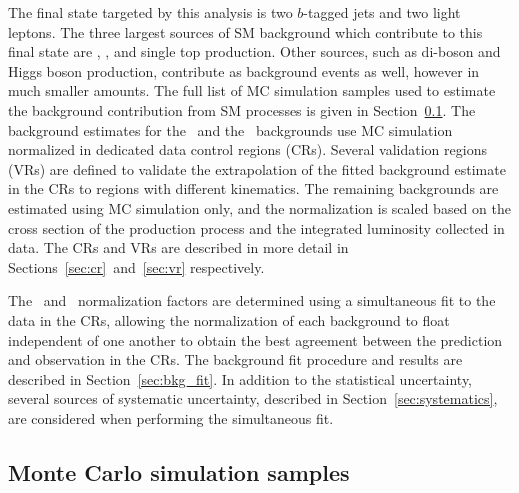 The final state targeted by this analysis is two $b$-tagged jets and two light
leptons.
The three largest sources of SM background which contribute to this final state
are \TTBAR, \ZGAMMAJETS, and single top production.
Other sources, such as di-boson and Higgs boson production, contribute as
background events as well, however in much smaller amounts.
The full list of MC simulation samples used to estimate the background
contribution from SM processes is given in Section~\ref{sec:mc_samples}.
The background estimates for the \TTBAR\ and the \ZGAMMAJETS\ backgrounds use
MC simulation normalized in dedicated data control regions (CRs).
Several validation regions (VRs) are defined to validate the extrapolation of
the fitted background estimate in the CRs to regions with different kinematics.
The remaining backgrounds are estimated using MC simulation only, and the
normalization is scaled based on the cross section of the production process and
the integrated luminosity collected in data.
The CRs and VRs are described in more detail in
Sections~\ref{sec:cr}~and~\ref{sec:vr} respectively.

The \TTBAR\ and \ZGAMMAJETS\ normalization factors are determined using a
simultaneous fit to the data in the CRs, allowing the normalization of each
background to float independent of one another to obtain the best agreement
between the prediction and observation in the CRs.
The background fit procedure and results are described in
Section~\ref{sec:bkg_fit}.
In addition to the statistical uncertainty, several sources of systematic
uncertainty, described in Section~\ref{sec:systematics}, are considered when
performing the simultaneous fit.

\FloatBarrier
\subsection{Monte Carlo simulation samples}
\label{sec:mc_samples}

